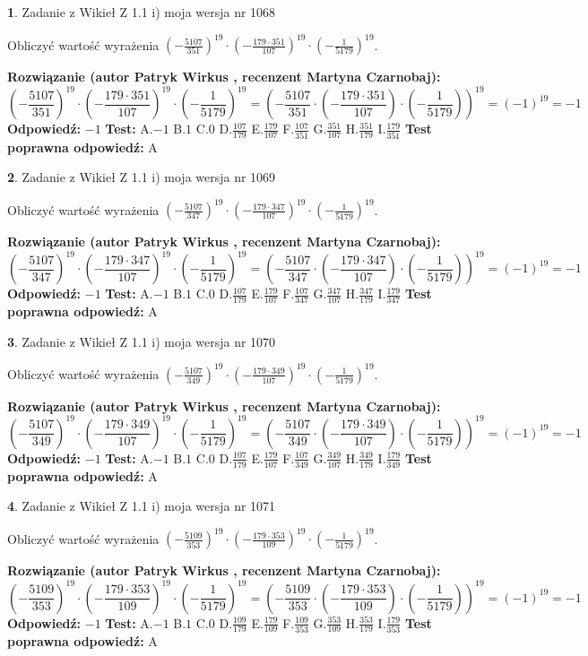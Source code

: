 \documentclass[12pt, a4paper]{article}
\theoremstyle{definition} %
\newtheorem{zad}{}
\newcommand{\zadStart}[1]{\begin{zad}#1\newline}
\newcommand{\zadStop}{\end{zad}}
\newcommand{\rozwStart}[2]{\noindent \textbf{Rozwiązanie (autor #1 , recenzent #2): }\newline}
\newcommand{\rozwStop}{\newline}
\newcommand{\odpStart}{\noindent \textbf{Odpowiedź:}\newline}
\newcommand{\odpStop}{\newline}
\newcommand{\testStart}{\noindent \textbf{Test:}\newline}
\newcommand{\testStop}{\newline}
\newcommand{\kluczStart}{\noindent \textbf{Test poprawna odpowiedź:}\newline}
\newcommand{\kluczStop}{\newline}
\begin{document}
\zadStart{Zadanie z Wikieł Z 1.1 i) moja wersja nr 1068}

Obliczyć wartość wyrażenia $(-\frac{5107}{351})^{19} \cdot (-\frac{179 \cdot 351}{107})^{19} \cdot (-\frac{1}{5179})^{19}$.
\zadStop
\rozwStart{Patryk Wirkus}{Martyna Czarnobaj}
$$(-\frac{5107}{351})^{19} \cdot (-\frac{179 \cdot 351}{107})^{19} \cdot (-\frac{1}{5179})^{19} = (-\frac{5107}{351} \cdot (-\frac{179 \cdot 351}{107}) \cdot (-\frac{1}{5179}))^{19} = (-1)^{19} = -1$$
\rozwStop
\odpStart
$-1$
\odpStop
\testStart
A.$-1$ B.$1$ C.$0$ D.$\frac{107}{179}$ E.$\frac{179}{107}$
F.$\frac{107}{351}$ G.$\frac{351}{107}$
H.$\frac{351}{179}$
I.$\frac{179}{351}$
\testStop
\kluczStart
A
\kluczStop



\zadStart{Zadanie z Wikieł Z 1.1 i) moja wersja nr 1069}

Obliczyć wartość wyrażenia $(-\frac{5107}{347})^{19} \cdot (-\frac{179 \cdot 347}{107})^{19} \cdot (-\frac{1}{5179})^{19}$.
\zadStop
\rozwStart{Patryk Wirkus}{Martyna Czarnobaj}
$$(-\frac{5107}{347})^{19} \cdot (-\frac{179 \cdot 347}{107})^{19} \cdot (-\frac{1}{5179})^{19} = (-\frac{5107}{347} \cdot (-\frac{179 \cdot 347}{107}) \cdot (-\frac{1}{5179}))^{19} = (-1)^{19} = -1$$
\rozwStop
\odpStart
$-1$
\odpStop
\testStart
A.$-1$ B.$1$ C.$0$ D.$\frac{107}{179}$ E.$\frac{179}{107}$
F.$\frac{107}{347}$ G.$\frac{347}{107}$
H.$\frac{347}{179}$
I.$\frac{179}{347}$
\testStop
\kluczStart
A
\kluczStop



\zadStart{Zadanie z Wikieł Z 1.1 i) moja wersja nr 1070}

Obliczyć wartość wyrażenia $(-\frac{5107}{349})^{19} \cdot (-\frac{179 \cdot 349}{107})^{19} \cdot (-\frac{1}{5179})^{19}$.
\zadStop
\rozwStart{Patryk Wirkus}{Martyna Czarnobaj}
$$(-\frac{5107}{349})^{19} \cdot (-\frac{179 \cdot 349}{107})^{19} \cdot (-\frac{1}{5179})^{19} = (-\frac{5107}{349} \cdot (-\frac{179 \cdot 349}{107}) \cdot (-\frac{1}{5179}))^{19} = (-1)^{19} = -1$$
\rozwStop
\odpStart
$-1$
\odpStop
\testStart
A.$-1$ B.$1$ C.$0$ D.$\frac{107}{179}$ E.$\frac{179}{107}$
F.$\frac{107}{349}$ G.$\frac{349}{107}$
H.$\frac{349}{179}$
I.$\frac{179}{349}$
\testStop
\kluczStart
A
\kluczStop



\zadStart{Zadanie z Wikieł Z 1.1 i) moja wersja nr 1071}

Obliczyć wartość wyrażenia $(-\frac{5109}{353})^{19} \cdot (-\frac{179 \cdot 353}{109})^{19} \cdot (-\frac{1}{5179})^{19}$.
\zadStop
\rozwStart{Patryk Wirkus}{Martyna Czarnobaj}
$$(-\frac{5109}{353})^{19} \cdot (-\frac{179 \cdot 353}{109})^{19} \cdot (-\frac{1}{5179})^{19} = (-\frac{5109}{353} \cdot (-\frac{179 \cdot 353}{109}) \cdot (-\frac{1}{5179}))^{19} = (-1)^{19} = -1$$
\rozwStop
\odpStart
$-1$
\odpStop
\testStart
A.$-1$ B.$1$ C.$0$ D.$\frac{109}{179}$ E.$\frac{179}{109}$
F.$\frac{109}{353}$ G.$\frac{353}{109}$
H.$\frac{353}{179}$
I.$\frac{179}{353}$
\testStop
\kluczStart
A
\kluczStop
\end{document}
